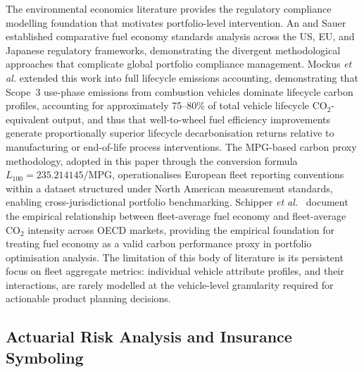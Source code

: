 \documentclass[conference]{IEEEtran}
\begin{document}
The environmental economics literature provides the regulatory compliance
modelling foundation that motivates portfolio-level intervention. An and
Sauer \cite{andsauer2004comparing} established comparative fuel economy
standards analysis across the US, EU, and Japanese regulatory frameworks,
demonstrating the divergent methodological approaches that complicate
global portfolio compliance management. Mockus \textit{et al.}
\cite{mockus2021lifecycle} extended this work into full lifecycle emissions
accounting, demonstrating that Scope~3 use-phase emissions from combustion
vehicles dominate lifecycle carbon profiles, accounting for approximately
75--80\% of total vehicle lifecycle CO$_2$-equivalent output, and thus
that well-to-wheel fuel efficiency improvements generate proportionally
superior lifecycle decarbonisation returns relative to manufacturing or
end-of-life process interventions. The MPG-based carbon proxy methodology,
adopted in this paper through the conversion formula
$L_{100} = 235.214145 / \mathrm{MPG}$, operationalises European fleet
reporting conventions within a dataset structured under North American
measurement standards, enabling cross-jurisdictional portfolio benchmarking.
Schipper \textit{et al.}\ \cite{schipper2002co2} document the empirical
relationship between fleet-average fuel economy and fleet-average CO$_2$
intensity across OECD markets, providing the empirical foundation for
treating fuel economy as a valid carbon performance proxy in portfolio
optimisation analysis. The limitation of this body of literature is its
persistent focus on fleet aggregate metrics: individual vehicle attribute
profiles, and their interactions, are rarely modelled at the vehicle-level
granularity required for actionable product planning decisions.

\subsection{Actuarial Risk Analysis and Insurance Symboling}
\end{document}
